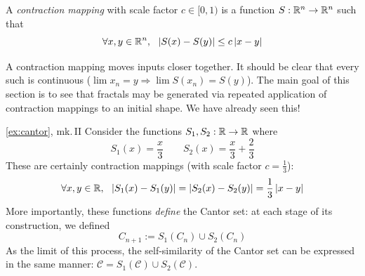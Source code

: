 \begin{defn}{}{}
	A \emph{contraction mapping} with scale factor $c\in[0,1)$ is a function $S:\mathbb{R}^n\to\mathbb{R}^n$ such that
	\[
		\forall x,y\in\mathbb{R}^n,\ \ \left| S(x)-S(y)\right|\le c\left| x-y\right|
	\]
\end{defn}

A contraction mapping moves inputs closer together. It should be clear that every such is continuous ($\lim x_n=y\Longrightarrow \lim S(x_n)=S(y)$). The main goal of this section is to see that fractals may be generated via repeated application of contraction mappings to an initial shape. We have already seen this!


\begin{example*}{\ref{ex:cantor}, mk.\,II}{}
	Consider the functions $S_1,S_2:\mathbb{R}\to\mathbb{R}$ where
	\[
		S_1(x)=\frac x3\qquad S_2(x)=\frac x3+\frac 23
	\]
	These are certainly contraction mappings (with scale factor $c=\frac 13$):
	\[
		\forall x,y\in\R,\ \ \nm{S_1(x)-S_1(y)}=\nm{S_2(x)-S_2(y)}=\frac 13\nm{x-y}
	\]
	More importantly, these functions \emph{define} the Cantor set: at each stage of its construction, we defined
	\[
		C_{n+1}:=S_1(C_n)\cup S_2(C_n)
	\]
	As the limit of this process, the self-similarity of the Cantor set can be expressed in the same manner: $\mathcal C=S_1(\mathcal C)\cup S_2(\mathcal C)$.\medbreak
	

\end{example*}
